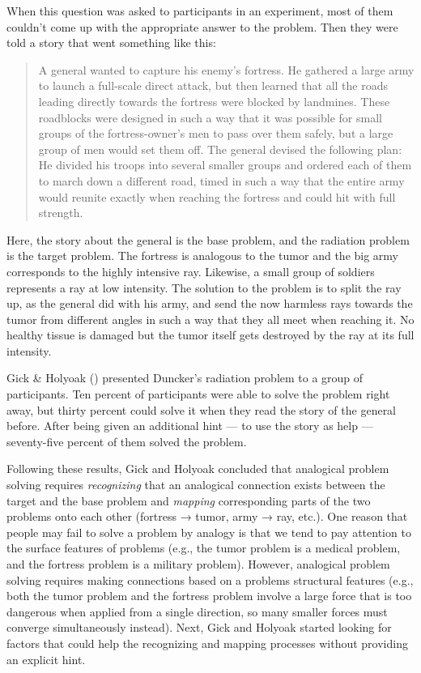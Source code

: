 \documentclass[
]{krantz}
\begin{document}
When this question was asked to participants in an experiment, most of them couldn't come up with the appropriate answer to the problem. Then they were told a story that went something like this:

\begin{quote}
A general wanted to capture his enemy's fortress. He gathered a large army to launch a full-scale direct attack, but then learned that all the roads leading directly towards the fortress were blocked by landmines. These roadblocks were designed in such a way that it was possible for small groups of the fortress-owner's men to pass over them safely, but a large group of men would set them off. The general devised the following plan: He divided his troops into several smaller groups and ordered each of them to march down a different road, timed in such a way that the entire army would reunite exactly when reaching the fortress and could hit with full strength.
\end{quote}

Here, the story about the general is the base problem, and the radiation problem is the target problem. The fortress is analogous to the tumor and the big army corresponds to the highly intensive ray. Likewise, a small group of soldiers represents a ray at low intensity. The solution to the problem is to split the ray up, as the general did with his army, and send the now harmless rays towards the tumor from different angles in such a way that they all meet when reaching it. No healthy tissue is damaged but the tumor itself gets destroyed by the ray at its full intensity.

Gick \& Holyoak () presented Duncker's radiation problem to a group of participants. Ten percent of participants were able to solve the problem right away, but thirty percent could solve it when they read the story of the general before. After being given an additional hint --- to use the story as help --- seventy-five percent of them solved the problem.

Following these results, Gick and Holyoak concluded that analogical problem solving requires
\emph{recognizing} that an analogical connection exists between the target and the base problem and \emph{mapping} corresponding parts of the two problems onto each other (fortress → tumor, army → ray, etc.). One reason that people may fail to solve a problem by analogy is that we tend to pay attention to the surface features of problems (e.g., the tumor problem is a medical problem, and the fortress problem is a military problem). However, analogical problem solving requires making connections based on a problems structural features (e.g., both the tumor problem and the fortress problem involve a large force that is too dangerous when applied from a single direction, so many smaller forces must converge simultaneously instead). Next, Gick and Holyoak started looking for factors that could help the recognizing and mapping processes without providing an explicit hint.
\end{document}
